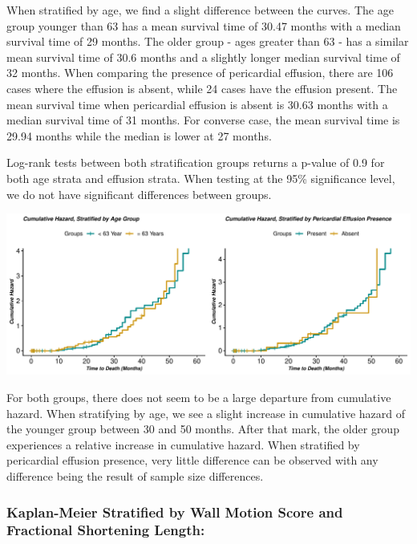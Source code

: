 \documentclass[
]{article}
\begin{document}
When stratified by age, we find a slight difference between the curves.
The age group younger than 63 has a mean survival time of 30.47 months
with a median survival time of 29 months. The older group - ages greater
than 63 - has a similar mean survival time of 30.6 months and a slightly
longer median survival time of 32 months. When comparing the presence of
pericardial effusion, there are 106 cases where the effusion is absent,
while 24 cases have the effusion present. The mean survival time when
pericardial effusion is absent is 30.63 months with a median survival
time of 31 months. For converse case, the mean survival time is 29.94
months while the median is lower at 27 months.

Log-rank tests between both stratification groups returns a p-value of
0.9 for both age strata and effusion strata. When testing at the 95\%
significance level, we do not have significant differences between
groups.

\begin{center}\includegraphics{markdown_files/figure-latex/km.haz1-1} \end{center}

For both groups, there does not seem to be a large departure from
cumulative hazard. When stratifying by age, we see a slight increase in
cumulative hazard of the younger group between 30 and 50 months. After
that mark, the older group experiences a relative increase in cumulative
hazard. When stratified by pericardial effusion presence, very little
difference can be observed with any difference being the result of
sample size differences.

\newpage

\hypertarget{kaplan-meier-stratified-by-wall-motion-score-and-fractional-shortening-length}{%
\subsubsection{Kaplan-Meier Stratified by Wall Motion Score and
Fractional Shortening
Length:}\label{kaplan-meier-stratified-by-wall-motion-score-and-fractional-shortening-length}}
\end{document}
